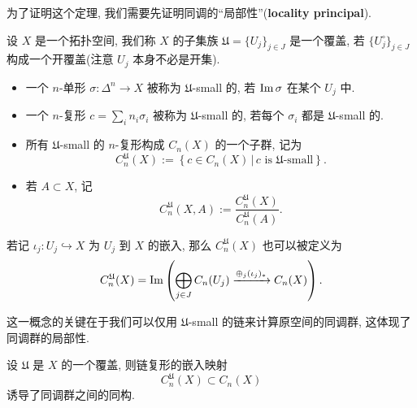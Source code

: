         为了证明这个定理, 我们需要先证明同调的“局部性”({\bf locality principal}).

        设 $X$ 是一个拓扑空间, 我们称 $X$ 的子集族 $\mathfrak{U}=\{U_j\}_{j\in J}$ 是一个覆盖, 若 $\{U_j^{\circ}\}_{j\in J}$ 构成一个开覆盖(注意 $U_j$ 本身不必是开集).

        \begin{definition}\hfill
            \begin{itemize}
                \item 一个 $n$-单形 $\sigma:\Delta^n\rightarrow X$ 被称为 $\mathfrak{U}$-small 的, 若 ${\rm Im}\,\sigma$ 在某个 $U_j$ 中.
                \item 一个 $n$-复形 $c=\sum_i{n_i\sigma_i}$ 被称为 $\mathfrak{U}$-small 的, 若每个 $\sigma_i$ 都是 $\mathfrak{U}$-small 的.
                \item 所有 $\mathfrak{U}$-small 的 $n$-复形构成 $C_n(X)$ 的一个子群, 记为
                \begin{equation*}
                    C^{\mathfrak{U}}_n(X):=\left\{c\in C_n(X)\,\big|\,c \text{ is $\mathfrak{U}$-small}\right\}.
                \end{equation*}
                \item 若 $A\subset X$, 记
                \begin{equation*}
                    C^{\mathfrak{U}}_n(X,A):=\frac{C^{\mathfrak{U}}_n(X)}{C^{\mathfrak{U}}_n(A)}.
                \end{equation*}
            \end{itemize}
        \end{definition}

        若记 $\iota_j:U_j\hookrightarrow X$ 为 $U_j$ 到 $X$ 的嵌入, 那么 $C^{\mathfrak{U}}_n(X)$ 也可以被定义为
        \begin{equation*}
            C^{\mathfrak{U}}_n(X) = {\rm Im}\left(\bigoplus_{j\in J}C_n(U_j)\xrightarrow{\oplus_j (\iota_{j})_*}C_n(X)\right).
        \end{equation*}

        这一概念的关键在于我们可以仅用 $\mathfrak{U}$-small 的链来计算原空间的同调群, 这体现了同调群的局部性.

        \begin{theorem}\label{thm:small-chain}
            设 $\mathfrak{U}$ 是 $X$ 的一个覆盖, 则链复形的嵌入映射
            \begin{equation*}
                C^{\mathfrak{U}}_n(X)\subset C_n(X)
            \end{equation*}
            诱导了同调群之间的同构.
        \end{theorem}

